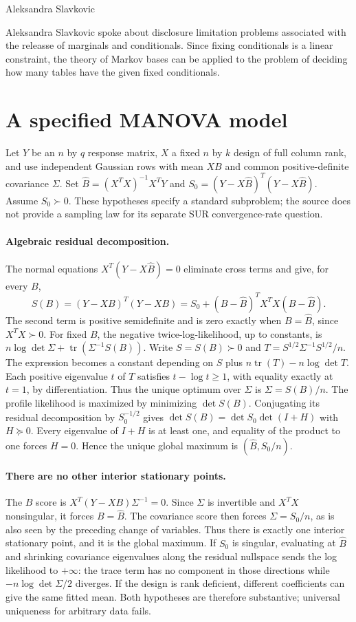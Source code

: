 \documentclass[11pt]{article}
\begin{document}
Aleksandra Slavkovic

Aleksandra Slavkovic spoke about disclosure limitation problems associated with the releasse of marginals and conditionals. Since fixing conditionals is a linear constraint, the theory of Markov bases can be applied to the problem of deciding how many tables have the given fixed conditionals.

\section{A specified MANOVA model}
Let $Y$ be an $n$ by $q$ response matrix, $X$ a fixed $n$ by $k$
design of full column rank, and use independent Gaussian rows with
mean $XB$ and common positive-definite covariance $\Sigma$.
Set $\widehat B=(X^TX)^{-1}X^TY$ and
$S_0=(Y-X\widehat B)^T(Y-X\widehat B)$. Assume $S_0\succ0$.
These hypotheses specify a standard subproblem; the source does not
provide a sampling law for its separate SUR convergence-rate question.

\paragraph{Algebraic residual decomposition.}
The normal equations $X^T(Y-X\widehat B)=0$ eliminate cross terms and
give, for every $B$,
\[
S(B)=(Y-XB)^T(Y-XB)
=S_0+(B-\widehat B)^TX^TX(B-\widehat B).
\]
The second term is positive semidefinite and is zero exactly when
$B=\widehat B$, since $X^TX\succ0$.
For fixed $B$, the negative twice-log-likelihood, up to constants, is
$n\log\det\Sigma+\operatorname{tr}(\Sigma^{-1}S(B))$.
Write $S=S(B)\succ0$ and $T=S^{1/2}\Sigma^{-1}S^{1/2}/n$.
The expression becomes a constant depending on $S$ plus
$n\operatorname{tr}(T)-n\log\det T$.
Each positive eigenvalue $t$ of $T$ satisfies $t-\log t\ge1$,
with equality exactly at $t=1$, by differentiation. Thus the unique
optimum over $\Sigma$ is $\Sigma=S(B)/n$.
The profile likelihood is maximized by minimizing $\det S(B)$.
Conjugating its residual decomposition by $S_0^{-1/2}$ gives
$\det S(B)=\det S_0\det(I+H)$ with $H\succeq0$. Every eigenvalue
of $I+H$ is at least one, and equality of the product to one forces
$H=0$. Hence the unique global maximum is
$(\widehat B,S_0/n)$.

\paragraph{There are no other interior stationary points.}
The $B$ score is $X^T(Y-XB)\Sigma^{-1}=0$. Since $\Sigma$ is invertible
and $X^TX$ nonsingular, it forces $B=\widehat B$. The covariance score
then forces $\Sigma=S_0/n$, as is also seen by the preceding change of
variables. Thus there is exactly one interior stationary point, and
it is the global maximum.
If $S_0$ is singular, evaluating at $\widehat B$ and shrinking covariance
eigenvalues along the residual nullspace sends the log likelihood to
$+\infty$: the trace term has no component in those directions while
$-n\log\det\Sigma/2$ diverges. If the design is rank deficient,
different coefficients can give the same fitted mean. Both hypotheses
are therefore substantive; universal uniqueness for arbitrary data fails.
\end{document}
